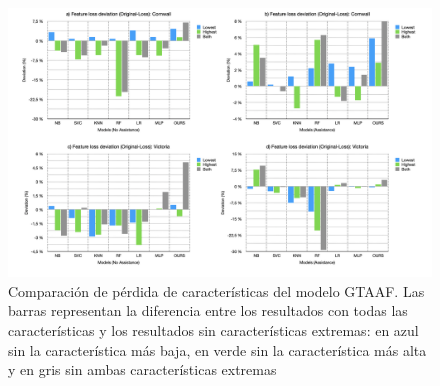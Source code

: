 \begin{figure}[H]
	\centering
	\includegraphics[width=150mm]{Figures/LossFeatures/loss.png}
	\caption[Comparación de pérdida de características del modelo GTAAF]{Comparación de pérdida de características del modelo GTAAF. Las barras representan la diferencia entre los resultados con todas las características y los resultados sin características extremas: en azul sin la característica más baja, en verde sin la característica más alta y en gris sin ambas características extremas}
	\label{lossFig}
\end{figure}

